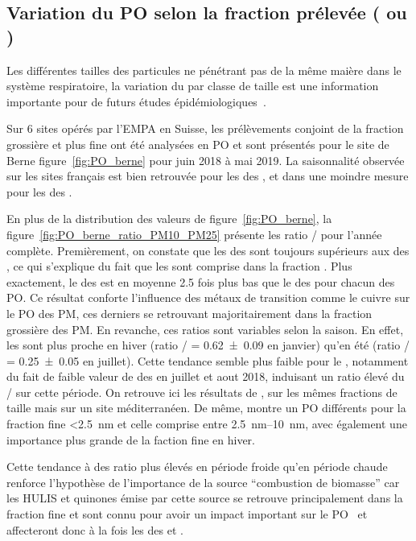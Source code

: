\subsection{Variation du PO selon la fraction prélevée (\PMdix{} ou \PMdc)}%
\label{sub:pm10_pm2_5}

Les différentes tailles des particules ne pénétrant pas de la même maière dans le système
respiratoire, la variation du \POv{} par classe de taille est une information importante
pour de futurs études épidémiologiques~\cite{fangOxidative2019}.

Sur 6 sites opérés par l'EMPA en Suisse, les prélèvements conjoint de la fraction grossière
\PMdix{} et plus fine \PMdc{} ont été analysées en PO et sont présentés pour le site de
Berne figure~\ref{fig:PO_berne} pour juin 2018 à mai 2019. La saisonnalité observée sur
les sites français est bien retrouvée pour les \POv{} des \PMdix, et dans une moindre
mesure pour les \POv{} des \PMdc.

En plus de la distribution des valeurs de \POv{} figure~\ref{fig:PO_berne}, la
figure~\ref{fig:PO_berne_ratio_PM10_PM25} présente les ratio \POv{} \PMdc/\PMdix{} pour
l'année complète. 
Premièrement, on constate que les \POv{} des \PMdix{} sont toujours supérieurs aux \POv{}
des \PMdc, ce qui s'explique du fait que les \PMdc{} sont comprise dans la fraction
\PMdix. Plus exactement, le \POv{} des \PMdc{} est en moyenne 2.5 fois plus bas que le
\POv{} des \PMdix{} pour chacun des PO. Ce résultat conforte l'influence des métaux de
transition comme le cuivre sur le PO des PM, ces derniers se retrouvant majoritairement
dans la fraction grossière des PM.
En revanche, ces ratios sont variables selon la saison. En effet, les \POAAv{} sont
plus proche en hiver (ratio \PMdc/\PMdix{} = \num{0.62(9)} en janvier) qu'en été (ratio
\PMdc/\PMdix{} = \num{0.25(5)} en juillet). Cette tendance semble plus faible pour le
\PODTTv, notamment du fait de faible valeur de \PODTTv{} des \PMdix{} en juillet et aout
2018, induisant un ratio élevé du \PODTTv{} \PMdc/\PMdix{} sur cette période.
On retrouve ici les résultats de \cite{perronePM22019}, sur les mêmes fractions de taille 
mais sur un site méditerranéen. De même, \cite{paraskevopoulouYearlong2019} montre un PO 
différents pour la fraction fine \SI{<2.5}{nm} et celle comprise entre \SIrange{2.5}{10}{nm},
avec également une importance plus grande de la faction fine en hiver.

Cette tendance à des ratio plus élevés en période froide qu'en période chaude renforce
l'hypothèse de l'importance de la source ``combustion de biomasse'' car les HULIS et
quinones émise par cette source se retrouve principalement dans la fraction fine
\PMdc{}\autocite{linAbundance2010,fangOxidative2019} et sont connu pour avoir un impact
important sur le PO~\autocite{vermaFractionating2015,maSources2018} et affecteront donc à
la fois les \POv{} des \PMdc{} et \PMdix.

